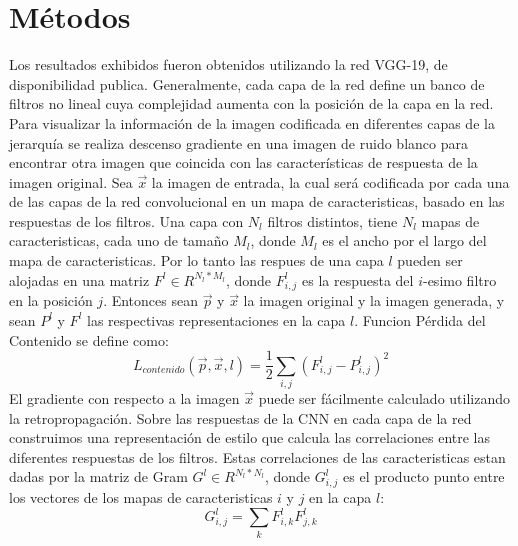 \documentclass[a4paper,11pt,spanish]{book}
\begin{document}
    \section{Métodos}
      Los resultados exhibidos fueron obtenidos utilizando la red VGG-19, de disponibilidad publica.
      Generalmente, cada capa de la red define un banco de filtros no lineal cuya complejidad aumenta con la posición de la capa en la red.
      Para visualizar la información de la imagen codificada en diferentes capas de la jerarquía se realiza descenso gradiente en una imagen de ruido blanco
      para encontrar otra imagen que coincida con las características de respuesta de la imagen original.
      Sea $\overrightarrow{x}$ la imagen de entrada, la cual será codificada por cada una de las capas de la red convolucional en un mapa de caracteristicas, basado en las respuestas de los filtros.
      Una capa con $N_l$ filtros distintos, tiene $N_l$ mapas de caracteristicas, cada uno de tamaño $M_l$, donde $M_l$ es el ancho por el largo del mapa de caracteristicas.
      Por lo tanto las respues de una capa $l$ pueden ser alojadas en una matriz $F^l \in R^{N_l * M_l}$, donde $F_{i,j}^l$ es la respuesta del $i$-esimo filtro en la posición $j$.
      Entonces sean $\overrightarrow{p}$ y $\overrightarrow{x}$ la imagen original y la imagen generada, y sean $P^l$ y $F^l$ las respectivas representaciones en la capa $l$.
      Funcion Pérdida del Contenido se define como:
      \begin{equation}
       L_{contenido}(\overrightarrow{p},\overrightarrow{x}, l) = \frac{1}{2} \sum_{i,j} (F_{i,j}^l - P_{i,j}^l)^2
      \end{equation}
      El gradiente con respecto a la imagen $\overrightarrow{x}$ puede ser fácilmente calculado utilizando la retropropagación.
      Sobre las respuestas de la CNN en cada capa de la red construimos una representación de estilo que calcula las correlaciones entre las diferentes respuestas de los filtros.
      Estas correlaciones de las caracteristicas estan dadas por la matriz de Gram $G^l \in R^{N_l * N_l}$, donde $G_{i,j}^l$ es el producto punto entre los vectores de los mapas de
      caracteristicas $i$ y $j$ en la capa $l$:
      \begin{equation}
	G_{i,j}^l = \sum_{k} F_{i,k}^l F_{j,k}^l
      \end{equation}
\end{document}
